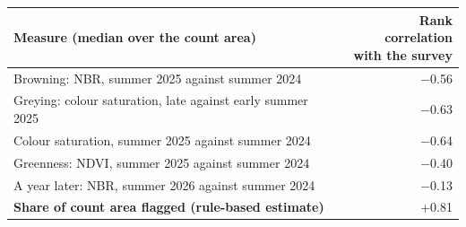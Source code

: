 \begin{tabular}{lr}
\toprule
Measure (median over the count area) & \makecell[r]{Rank correlation\\with the survey} \\
\midrule
Browning: NBR, summer 2025 against summer 2024 & $-$0.56 \\
Greying: colour saturation, late against early summer 2025 & $-$0.63 \\
Colour saturation, summer 2025 against summer 2024 & $-$0.64 \\
Greenness: NDVI, summer 2025 against summer 2024 & $-$0.40 \\
A year later: NBR, summer 2026 against summer 2024 & $-$0.13 \\
\textbf{Share of count area flagged (rule-based estimate)} & +0.81 \\
\bottomrule
\end{tabular}
